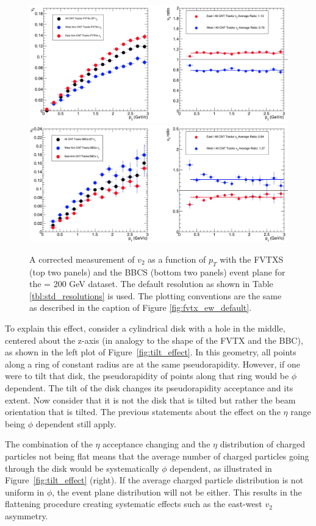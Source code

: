 \begin{figure}[!ht]
\centering
\includegraphics[width=0.85\linewidth]{figs/fvtx_vertex_rot_only.png}
\includegraphics[width=0.85\linewidth]{figs/bbc_vertex_rot_only.png}
\caption{A corrected measurement of $v_{2}$ as a function of $p_T$ with the FVTXS (top two panels) and the BBCS (bottom two panels) event plane for the \pau \sqsn = 200 GeV dataset. The default resolution as shown in Table \ref{tbl:std_resolutions} is used. The plotting conventions are the same as described in the caption of Figure \ref{fig:fvtx_ew_default}. }
\label{fig:fvtx_ew_rot}
\end{figure}

To explain this effect, consider a cylindrical disk with a hole in the middle, centered about the z-axis (in analogy to the shape of the FVTX and the BBC), as shown in the left plot of Figure~\ref{fig:tilt_effect}. In this geometry, all points along a ring of constant radius are at the same pseudorapidity. However, if one were to tilt that disk, the pseudorapidity of points along that ring would be $\phi$ dependent. The tilt of the disk changes its pseudorapidity acceptance and its extent. Now consider that it is not the disk that is tilted but rather the beam orientation that is tilted. The previous statements about the effect on the $\eta$ range being $\phi$ dependent still apply. 

The combination of the $\eta$ acceptance changing and the $\eta$ distribution of charged particles not being flat means that the average number of charged particles going through the disk would be systematically $\phi$ dependent, as illustrated in Figure~\ref{fig:tilt_effect} (right). If the average charged particle distribution is not uniform in $\phi$, the event plane distribution will not be either. This results in the flattening procedure creating systematic effects such as the east-west $v_2$ asymmetry.


